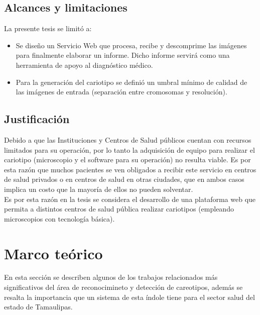 \documentclass[12pt,letterpaper,titlepage]{article}
\begin{document}
\section{Alcances y limitaciones}\label{limitaciones}

La presente tesis se limitó a:

\begin{itemize}\itemsep=0pt
\item Se diseño un Servicio Web que procesa, recibe y descomprime las imágenes para finalmente elaborar un informe. Dicho informe servirá como una herramienta de apoyo al diagnóstico médico.
\item Para la generación del cariotipo se definió un umbral mínimo de calidad de las imágenes de entrada (separación entre cromosomas y resolución).
\end{itemize}


\section{Justificación}\label{Justi}

Debido a que las Instituciones y Centros de Salud públicos cuentan con recursos limitados para su operación, por lo tanto la adquisición de equipo para realizar el cariotipo (microscopio y el software para su operación) no resulta viable. Es por esta razón que muchos pacientes se ven obligados a recibir este servicio en centros de salud privados o en centros de salud en otras ciudades, que en ambos casos implica un costo que la mayoría de ellos no pueden solventar.\\

Es por esta razón en la tesis se considera el desarrollo de una plataforma web que permita a distintos centros de salud pública realizar cariotipos (empleando microscopios con tecnología básica).\\




\newpage
\chapter{Marco teórico}\label{capII}

En esta sección se describen algunos de los trabajos relacionados más significativos del área de reconocimineto y detección de careotipos, además se resalta la importancia que un sistema de esta índole tiene para el sector salud del estado de Tamaulipas.
\end{document}
